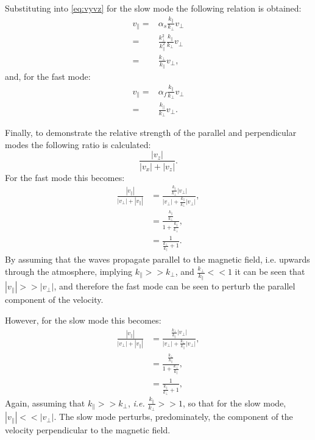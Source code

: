 \documentclass[a4paper,12pt,fourier,authoryear,custommargin]{Classes/PhDThesisPSnPDF}
\begin{document}
Substituting into \cref{eq:vyvz} for the slow mode the following relation is obtained:
\begin{align}
    v_\parallel =& \alpha_s \frac{k_\parallel}{k_\perp}v_\perp\\
                =& \frac{k^2_\perp}{k^2_\parallel}\frac{k_\parallel}{k_\perp}v_\perp\\
                =& \frac{k_\perp}{k_\parallel}v_\perp,
\end{align}
and, for the fast mode:
\begin{align}
    v_\parallel =& \alpha_f \frac{k_\parallel}{k_\perp}v_\perp\\
                =& \frac{k_\parallel}{k_\perp}v_\perp.
\end{align}

Finally, to demonstrate the relative strength of the parallel and perpendicular modes the following ratio is calculated:
\begin{equation}
    \frac{|v_z|}{|v_x|+|v_z|}.
\end{equation}
For the fast mode this becomes:
\begin{align}
\frac{|v_\parallel|}{|v_\perp|+|v_\parallel|} &= \frac{\frac{k_\parallel}{k_\perp}|v_\perp|}{|v_\perp|+\frac{k_\parallel}{k_\perp}|v_\perp|},\\
&= \frac{\frac{k_\parallel}{k_\perp}}{1+\frac{k_\parallel}{k_\perp}},\\
&= \frac{1}{\frac{k_\perp}{k_\parallel}+1}.
\end{align}
By assuming that the waves propagate parallel to the magnetic field, i.e. upwards through the atmosphere, implying $k_\parallel >> k_\perp$, and $\displaystyle \frac{k_\perp}{k_\parallel} << 1$ it can be seen that $|v_\parallel| >> |v_\perp|$, and therefore the fast mode can be seen to perturb the parallel component of the velocity.

However, for the slow mode this becomes:
\begin{align}
    \frac{|v_\parallel|}{|v_\perp|+|v_\parallel|} &= \frac{\frac{k_\perp}{k_\parallel}|v_\perp|}{|v_\perp|+\frac{k_\perp}{k_\parallel}|v_\perp|},\\
    &= \frac{\frac{k_\perp}{k_\parallel}}{1+\frac{k_\perp}{k_\parallel}},\\
    &= \frac{1}{\frac{k_\parallel}{k_\perp} + 1},
\end{align}
Again, assuming that $k_\parallel >> k_\perp$, \textit{i.e.} $\displaystyle \frac{k_\parallel}{k_\perp} >> 1$, so that for the slow mode, $|v_\parallel| << |v_\perp|$.
The slow mode perturbs, predominately, the component of the velocity perpendicular to the magnetic field.  
\end{document}
